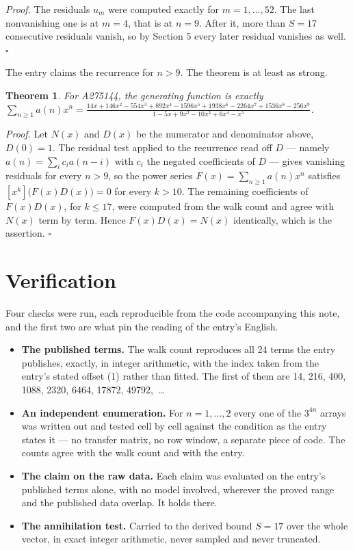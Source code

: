 \documentclass[11pt]{article}
\newtheorem{theorem}{Theorem}
\theoremstyle{definition}
\begin{document}
{\itshape Proof.} The residuals $u_m$ were computed exactly for $m = 1,\dots,52$. The last nonvanishing one is at $m = 4$, that is at $n = 9$. After it, more than $S = 17$ consecutive residuals vanish, so by Section 5 every later residual vanishes as well. $\square$

The entry claims the recurrence for $n > 9$. The theorem is at least as strong.

\begin{theorem} For A275144, the generating function is exactly $\sum_{n\ge 1} a(n)x^n = \frac{14x + 146x^{2} - 554x^{3} + 892x^{4} - 1596x^{5} + 1938x^{6} - 2264x^{7} + 1536x^{8} - 256x^{9}}{1 - 5x + 9x^{2} - 10x^{3} + 6x^{4} - x^{5}}$.\end{theorem}

{\itshape Proof.} Let $N(x)$ and $D(x)$ be the numerator and denominator above, $D(0)=1$. The residual test applied to the recurrence read off $D$ --- namely $a(n) = \sum_i c_i a(n-i)$ with $c_i$ the negated coefficients of $D$ --- gives vanishing residuals for every $n > 9$, so the power series $F(x)=\sum_{n\ge 1}a(n)x^n$ satisfies $[x^k]\bigl(F(x)D(x)\bigr) = 0$ for every $k > 10$. The remaining coefficients of $F(x)D(x)$, for $k \le 17$, were computed from the walk count and agree with $N(x)$ term by term. Hence $F(x)D(x) = N(x)$ identically, which is the assertion. $\square$

\section{Verification}

Four checks were run, each reproducible from the code accompanying this note, and the first two are what pin the reading of the entry's English.

\begin{itemize}

\item {\bfseries The published terms.} The walk count reproduces all 24 terms the entry publishes, exactly, in integer arithmetic, with the index taken from the entry's stated offset (1) rather than fitted. The first of them are 14, 216, 400, 1088, 2320, 6464, 17872, 49792,~\dots

\item {\bfseries An independent enumeration.} For $n = 1,\dots,2$ every one of the $3^{4n}$ arrays was written out and tested cell by cell against the condition as the entry states it --- no transfer matrix, no row window, a separate piece of code. The counts agree with the walk count and with the entry.

\item {\bfseries The claim on the raw data.} Each claim was evaluated on the entry's published terms alone, with no model involved, wherever the proved range and the published data overlap. It holds there.

\item {\bfseries The annihilation test.} Carried to the derived bound $S = 17$ over the whole vector, in exact integer arithmetic, never sampled and never truncated.

\end{itemize}
\end{document}
